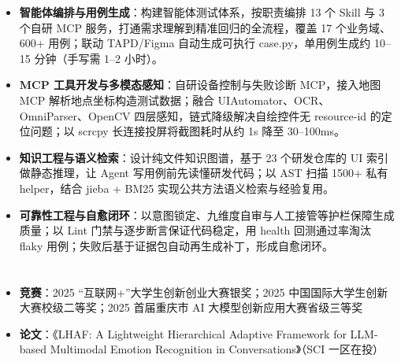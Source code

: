 \documentclass[10pt]{article}
\begin{document}
    \vspace{0.25em}

    \begin{itemize}
        \item \textbf{智能体编排与用例生成}：构建智能体测试体系，按职责编排 13 个 Skill 与 3 个自研 MCP 服务，打通需求理解到精准回归的全流程，覆盖 17 个业务域、600+ 用例；联动 TAPD/Figma 自动生成可执行 case.py，单用例生成约 10--15 分钟（手写需 1--2 小时）。
        \item \textbf{MCP 工具开发与多模态感知}：自研设备控制与失败诊断 MCP，接入地图 MCP 解析地点坐标构造测试数据；融合 UIAutomator、OCR、OmniParser、OpenCV 四层感知，链式降级解决自绘控件无 resource-id 的定位问题；以 scrcpy 长连接投屏将截图耗时从约 1s 降至 30--100ms。
        \item \textbf{知识工程与语义检索}：设计纯文件知识图谱，基于 23 个研发仓库的 UI 索引做静态推理，让 Agent 写用例前先读懂研发代码；以 AST 扫描 1500+ 私有 helper，结合 jieba + BM25 实现公共方法语义检索与经验复用。
        \item \textbf{可靠性工程与自愈闭环}：以意图锁定、九维度自审与人工接管等护栏保障生成质量；以 Lint 门禁与逐步断言保证代码稳定，用 health 回测通过率淘汰 flaky 用例；失败后基于证据包自动再生成补丁，形成自愈闭环。
    \end{itemize}


    \section[在校成果]{}
    \begin{itemize}
        \item \textbf{竞赛}：2025 “互联网+”大学生创新创业大赛银奖；2025 中国国际大学生创新大赛校级二等奖；2025 首届重庆市 AI 大模型创新应用大赛省级三等奖
        \item \textbf{论文}：《LHAF: A Lightweight Hierarchical Adaptive Framework for LLM-based Multimodal Emotion Recognition in Conversations》（SCI 一区在投）
    \end{itemize}
\end{document}
